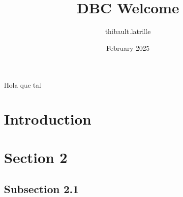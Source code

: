 \documentclass{article}
\title{DBC Welcome}
\author{thibault.latrille }
\date{February 2025}
\begin{document}
Hola que tal
\maketitle

\section{Introduction}


\section{Section 2}
\subsection{Subsection 2.1}
\end{document}
